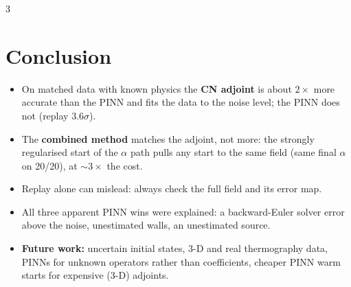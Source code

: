 \documentclass[a0,portrait]{a0poster}
\begin{document}
\begin{minipage}[c]{\linewidth}
\begin{framed}
\begin{multicols}{3}
\section*{Conclusion}
\begin{itemize}
\item On matched data with known physics the \textcolor{adj}{\textbf{CN adjoint}} is about $2\times$ more accurate
than the PINN and fits the data to the noise level; the PINN does not (replay $3.6\sigma$).
\item The \textcolor{joint}{\textbf{combined method}} matches the adjoint, not more: the strongly regularised start of the
$\alpha$ path pulls any start to the same field (same final $\alpha$ on 20/20), at $\sim3\times$ the cost.
\item Replay alone can mislead: always check the full field and its error map.
\item All three apparent PINN wins were explained: a backward-Euler solver error above the noise, unestimated walls,
an unestimated source.
\item \textbf{Future work:} uncertain initial states, 3-D and real thermography data, PINNs for unknown operators
rather than coefficients, cheaper PINN warm starts for expensive (3-D) adjoints.
\end{itemize}


\end{multicols}
\end{framed}
\end{minipage}
\end{document}
